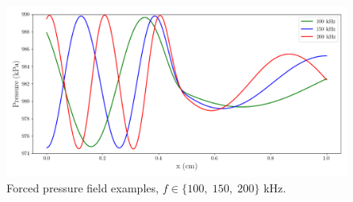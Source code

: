 \begin{figure}
	\centering
	\includegraphics[width=0.9\linewidth]{Chapters/TransientFlame/Images/fom/fom_press_snaps.png}
	\caption{\label{fig:flameFOMPress}Forced pressure field examples, $f \in \{100, \; 150, \; 200\}$ kHz.}
\end{figure}

